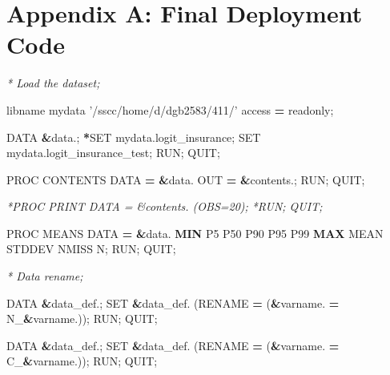 \documentclass[]{article}
\newenvironment{Shaded}{\begin{snugshade}}{\end{snugshade}}
\newcommand{\KeywordTok}[1]{\textcolor[rgb]{0.13,0.29,0.53}{\textbf{{#1}}}}
\newcommand{\DataTypeTok}[1]{\textcolor[rgb]{0.13,0.29,0.53}{{#1}}}
\newcommand{\StringTok}[1]{\textcolor[rgb]{0.31,0.60,0.02}{{#1}}}
\newcommand{\CommentTok}[1]{\textcolor[rgb]{0.56,0.35,0.01}{\textit{{#1}}}}
\newcommand{\FunctionTok}[1]{\textcolor[rgb]{0.00,0.00,0.00}{{#1}}}
\newcommand{\NormalTok}[1]{{#1}}
\begin{document}
\newpage

\section{Appendix A: Final Deployment
Code}\label{appendix-a-final-deployment-code}

\begin{Shaded}
\begin{Highlighting}[]

\NormalTok{%
\NormalTok{%
\NormalTok{%
\NormalTok{%

\NormalTok{%
\NormalTok{%


\CommentTok{* Load the dataset;}

\NormalTok{libname mydata }\StringTok{'/sscc/home/d/dgb2583/411/'} \FunctionTok{access} \KeywordTok{=} \NormalTok{readonly;}

\DataTypeTok{DATA} \KeywordTok{&}\NormalTok{data.;}
    \KeywordTok{*}\NormalTok{SET mydata.logit_insurance;}
    \NormalTok{SET mydata.logit_insurance_test;}
\NormalTok{RUN; QUIT;}

\NormalTok{PROC CONTENTS DATA }\KeywordTok{=} \KeywordTok{&}\NormalTok{data. OUT }\KeywordTok{=} \KeywordTok{&}\NormalTok{contents.;}
\NormalTok{RUN; QUIT;}

\CommentTok{*PROC PRINT DATA = &contents. (OBS=20);}
\CommentTok{*RUN; QUIT;}

\NormalTok{PROC MEANS DATA }\KeywordTok{=} \KeywordTok{&}\NormalTok{data. }\KeywordTok{MIN} \NormalTok{P5 P50 P90 P95 P99 }\KeywordTok{MAX} \NormalTok{MEAN STDDEV NMISS N;}
\NormalTok{RUN; QUIT;}


\CommentTok{* Data rename;}

\NormalTok{%
\DataTypeTok{    DATA} \KeywordTok{&}\NormalTok{data_def.;}
        \NormalTok{SET }\KeywordTok{&}\NormalTok{data_def. (RENAME }\KeywordTok{=} \NormalTok{(}\KeywordTok{&}\NormalTok{varname. }\KeywordTok{=} \NormalTok{N_}\KeywordTok{&}\NormalTok{varname.));}
    \NormalTok{RUN; QUIT;}
\NormalTok{%

\NormalTok{%
\DataTypeTok{    DATA} \KeywordTok{&}\NormalTok{data_def.;}
        \NormalTok{SET }\KeywordTok{&}\NormalTok{data_def. (RENAME }\KeywordTok{=} \NormalTok{(}\KeywordTok{&}\NormalTok{varname. }\KeywordTok{=} \NormalTok{C_}\KeywordTok{&}\NormalTok{varname.));}
    \NormalTok{RUN; QUIT;}
\NormalTok{%

}}}}}}}}}}
\end{Highlighting}
\end{Shaded}
\end{document}
